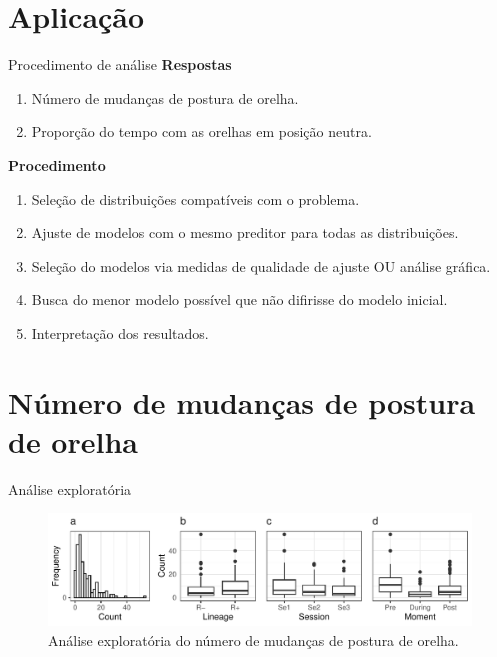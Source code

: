 \documentclass[
  ignorenonframetext,
  serif,
  professionalfont,
  usenames,
  dvipsnames,
  aspectratio = 169]{beamer}
\providecommand{\tightlist}{%
  \setlength{\itemsep}{0pt}\setlength{\parskip}{0pt}}
\renewcommand{\tightlist}{%
  \setlength{\itemsep}{0\baselineskip}
  \setlength{\parskip}{0.25\baselineskip}
}
\begin{document}
\hypertarget{aplicauxe7uxe3o}{%
\section{Aplicação}\label{aplicauxe7uxe3o}}

\begin{frame}{Procedimento de análise}
\protect\hypertarget{procedimento-de-anuxe1lise}{}
\textbf{Respostas}

\begin{enumerate}
\tightlist
\item
  Número de mudanças de postura de orelha.
\item
  Proporção do tempo com as orelhas em posição neutra.
\end{enumerate}

\textbf{Procedimento}

\begin{enumerate}
\tightlist
\item
  Seleção de distribuições compatíveis com o problema.
\item
  Ajuste de modelos com o mesmo preditor para todas as distribuições.
\item
  Seleção do modelos via medidas de qualidade de ajuste OU análise
  gráfica.
\item
  Busca do menor modelo possível que não difirisse do modelo inicial.
\item
  Interpretação dos resultados.
\end{enumerate}
\end{frame}

\hypertarget{nuxfamero-de-mudanuxe7as-de-postura-de-orelha}{%
\section{Número de mudanças de postura de
orelha}\label{nuxfamero-de-mudanuxe7as-de-postura-de-orelha}}

\begin{frame}{Análise exploratória}
\protect\hypertarget{anuxe1lise-exploratuxf3ria}{}
\begin{figure}

{\centering \includegraphics[width=0.95\linewidth]{./img/count} 

}

\caption{Análise exploratória do número de mudanças de postura de orelha.}\label{fig:unnamed-chunk-10}
\end{figure}
\end{frame}
\end{document}
